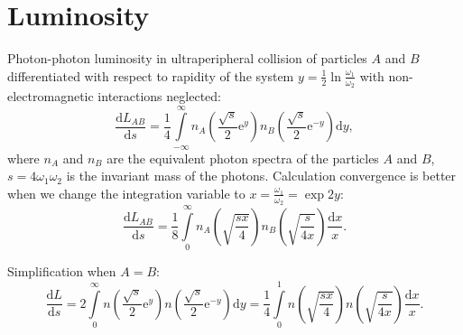 \documentclass[a4paper,12pt]{article}
\begin{document}
\section{Luminosity}

Photon-photon luminosity in ultraperipheral collision of particles $A$ and $B$
differentiated with respect to rapidity of the system $y = \tfrac12 \ln
\tfrac{\omega_1}{\omega_2}$ with non-electromagnetic interactions neglected:
\begin{equation}
  \frac{\mathrm{d} L_{AB}}{\mathrm{d} s}
  = \frac14
    \int\limits_{-\infty}^{\infty}
      n_A \left( \frac{\sqrt{s}}{2} \mathrm{e}^y \right)
      n_B \left( \frac{\sqrt{s}}{2} \mathrm{e}^{-y} \right)
    \mathrm{d} y,
\end{equation}
where $n_A$ and $n_B$ are the equivalent photon spectra of the particles $A$ and
$B$, $s = 4 \omega_1 \omega_2$ is the invariant mass of the photons. Calculation
convergence is better when we change the integration variable to $x =
\frac{\omega_1}{\omega_2} = \exp{2 y}$:
\begin{equation}
  \frac{\mathrm{d} L_{AB}}{\mathrm{d} s}
  = \frac18
    \int\limits_0^\infty
       n_A \left( \sqrt{\frac{sx}{4}} \right)
       n_B \left( \sqrt{\frac{s}{4x}} \right)
       \frac{\mathrm{d} x}{x}.
\end{equation}

Simplification when $A = B$:
\begin{equation}
  \frac{\mathrm {d} L}{\mathrm{d} s}
  = 2 \int\limits_0^\infty
        n \left( \frac{\sqrt{s}}{2} \mathrm{e}^y \right)
        n \left( \frac{\sqrt{s}}{2} \mathrm{e}^{-y} \right)
      \mathrm{d} y
  = \frac14
    \int\limits_0^1
      n \left( \sqrt{\frac{sx}{4}} \right)
      n \left( \sqrt{\frac{s}{4x}} \right)
      \frac{\mathrm{d} x}{x}.
\end{equation}
\end{document}
